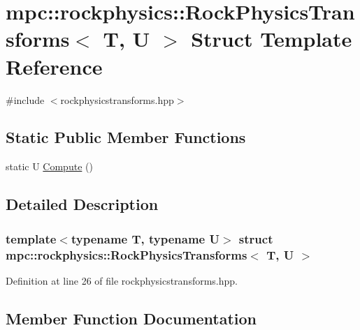 \hypertarget{structmpc_1_1rockphysics_1_1_rock_physics_transforms}{}\section{mpc\+:\+:rockphysics\+:\+:Rock\+Physics\+Transforms$<$ T, U $>$ Struct Template Reference}
\label{structmpc_1_1rockphysics_1_1_rock_physics_transforms}


{\ttfamily \#include $<$rockphysicstransforms.\+hpp$>$}

\subsection*{Static Public Member Functions}
\begin{DoxyCompactItemize}
\item 
static U \mbox{\hyperlink{structmpc_1_1rockphysics_1_1_rock_physics_transforms_abcf6ae16510c01c18d574bd78d3c3bdc}{Compute}} ()
\end{DoxyCompactItemize}


\subsection{Detailed Description}
\subsubsection*{template$<$typename T, typename U$>$\newline
struct mpc\+::rockphysics\+::\+Rock\+Physics\+Transforms$<$ T, U $>$}



Definition at line 26 of file rockphysicstransforms.\+hpp.



\subsection{Member Function Documentation}
\mbox{\label{structmpc_1_1rockphysics_1_1_rock_physics_transforms_abcf6ae16510c01c18d574bd78d3c3bdc}} 
